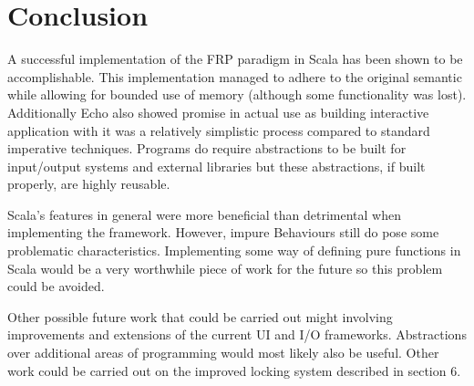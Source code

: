\chapter{Conclusion}

A successful implementation of the FRP paradigm in Scala has been shown to be accomplishable. This implementation
managed to adhere to the original semantic while allowing for bounded use of memory (although some functionality was
lost). Additionally Echo also showed promise in actual use as building interactive application with it
was a relatively simplistic process compared to standard imperative techniques. Programs do require abstractions
to be built for input/output systems and external libraries but these abstractions, if built properly, are highly
reusable.

Scala's features in general were more beneficial than detrimental when implementing the framework. However,
impure Behaviours still do pose some problematic characteristics. Implementing some way of defining pure functions
in Scala would be a very worthwhile piece of work for the future so this problem could be avoided.

Other possible future work that could be carried out might involving improvements and extensions of the current UI
and I/O frameworks. Abstractions over additional areas of programming would most likely also be useful. Other work
could be carried out on the improved locking system described in section 6.